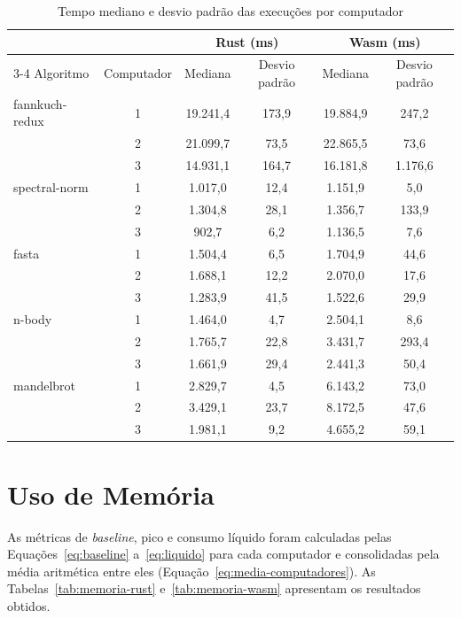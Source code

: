\begin{table}[H]
    \caption{Tempo mediano e desvio padrão das execuções por computador}
    \label{tab:tempo-computador}
    \centering
    \setlength{\tabcolsep}{4pt}
    \begin{tabular}{lccccc}
        \hline
        & & \multicolumn{2}{c}{Rust (ms)} & \multicolumn{2}{c}{Wasm (ms)} \\
        \cline{3-4} \cline{5-6}
        Algoritmo & Computador & Mediana & Desvio padrão & Mediana & Desvio padrão \\
        \hline
        fannkuch-redux & 1 & 19.241,4 & 173,9 & 19.884,9 & 247,2 \\
         & 2 & 21.099,7 & 73,5 & 22.865,5 & 73,6 \\
         & 3 & 14.931,1 & 164,7 & 16.181,8 & 1.176,6 \\
        \hline
        spectral-norm & 1 & 1.017,0 & 12,4 & 1.151,9 & 5,0 \\
         & 2 & 1.304,8 & 28,1 & 1.356,7 & 133,9 \\
         & 3 & 902,7 & 6,2 & 1.136,5 & 7,6 \\
        \hline
        fasta & 1 & 1.504,4 & 6,5 & 1.704,9 & 44,6 \\
         & 2 & 1.688,1 & 12,2 & 2.070,0 & 17,6 \\
         & 3 & 1.283,9 & 41,5 & 1.522,6 & 29,9 \\
        \hline
        n-body & 1 & 1.464,0 & 4,7 & 2.504,1 & 8,6 \\
         & 2 & 1.765,7 & 22,8 & 3.431,7 & 293,4 \\
         & 3 & 1.661,9 & 29,4 & 2.441,3 & 50,4 \\
        \hline
        mandelbrot & 1 & 2.829,7 & 4,5 & 6.143,2 & 73,0 \\
         & 2 & 3.429,1 & 23,7 & 8.172,5 & 47,6 \\
         & 3 & 1.981,1 & 9,2 & 4.655,2 & 59,1 \\
        \hline
    \end{tabular}
\end{table}

\section{Uso de Memória}

As métricas de \emph{baseline}, pico e consumo líquido foram calculadas pelas Equações~\eqref{eq:baseline} a~\eqref{eq:liquido} para cada computador e consolidadas pela média aritmética entre eles (Equação~\eqref{eq:media-computadores}). As Tabelas~\ref{tab:memoria-rust} e~\ref{tab:memoria-wasm} apresentam os resultados obtidos.

